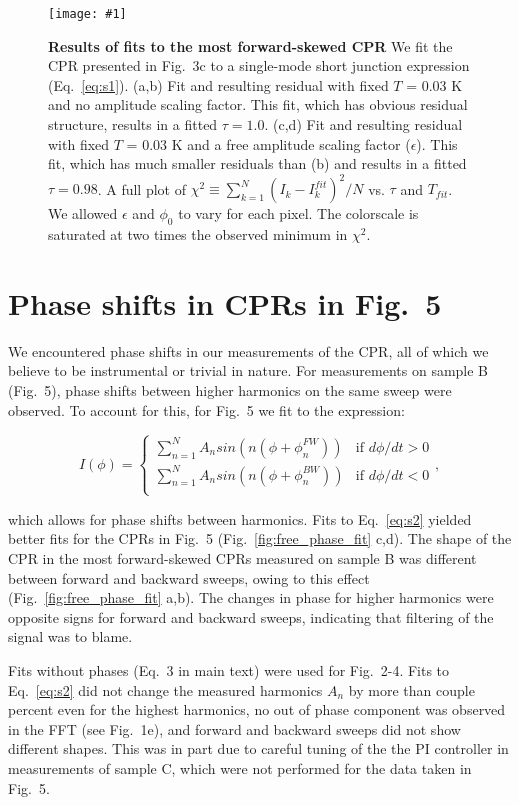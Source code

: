 \documentclass[11pt]{article}
\newcommand{\fig}[5]{
	\begin{figure}
	\centerline{\texttt{[image: \#1]}}
\caption[#3]{\label{#2} \textbf{#3} #4}
\end{figure}}
\begin{document}
\fig{./fit_perfect.pdf}{fig:fit_perfect}
{Results of fits to the most forward-skewed CPR }
{We fit the CPR presented in Fig.~3c to a single-mode short junction expression (Eq.~\ref{eq:s1}). (a,b) Fit and resulting residual with fixed $T$ = 0.03 K and no amplitude scaling factor. This fit, which has obvious residual structure, results in a fitted $\tau = 1.0$. (c,d) Fit and resulting residual with fixed $T$ = 0.03 K and a free amplitude scaling factor ($\epsilon$). This fit, which has much smaller residuals than (b) and results in a fitted $\tau = 0.98$. A full plot of $\chi^2 \equiv \sum_{k=1}^N (I_k - I^{fit}_k)^2/N $ vs. $\tau$ and $T_{fit}$. We allowed $\epsilon$ and $\phi_0$ to vary for each pixel. The colorscale is saturated at two times the observed minimum in $\chi^2$. }{1.0}

\section{Phase shifts in CPRs in Fig.~5}
We encountered phase shifts in our measurements of the CPR, all of which we believe to be instrumental or trivial in nature. For measurements on sample B (Fig.~5), phase shifts between higher harmonics on the same sweep were observed. To account for this, for Fig.~5 we fit to the expression:

\begin{equation}\label{eq:s2}
I(\phi) = \begin{cases} \sum_{n=1}^N A_n sin (n (\phi + \phi^{FW}_n)) &\mbox{if }d\phi/dt > 0 \\ 
\sum_{n=1}^N A_n sin (n (\phi + \phi^{BW}_n)) &\mbox{if } d\phi/dt < 0 \\ 
\end{cases}, 
\end{equation}

which allows for phase shifts between harmonics. Fits to Eq.~\ref{eq:s2} yielded better fits for the CPRs in Fig.~5 (Fig.~\ref{fig:free_phase_fit} c,d). The shape of the CPR in the most forward-skewed CPRs measured on sample B was different between forward and backward sweeps, owing to this effect (Fig.~\ref{fig:free_phase_fit} a,b). The changes in phase for higher harmonics were opposite signs for forward and backward sweeps, indicating that filtering of the signal was to blame. 

Fits without phases (Eq.~3 in main text) were used for Fig.~2-4. Fits to Eq.~\ref{eq:s2} did not change the measured harmonics $A_n$ by more than couple percent even for the highest harmonics, no out of phase component was observed in the FFT (see Fig.~1e), and forward and backward sweeps did not show different shapes. This was in part due to careful tuning of the the PI controller in measurements of sample C, which were not performed for the data taken in Fig.~5. 
\end{document}
